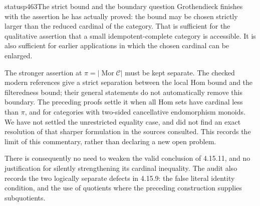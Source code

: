 \begin{dcomment}{status}{p463}{The strict bound and the boundary question}
Grothendieck finishes with the assertion he has actually proved: the bound may be chosen strictly larger than the reduced cardinal of the category. That is sufficient for the qualitative assertion that a small idempotent-complete category is accessible. It is also sufficient for earlier applications in which the chosen cardinal can be enlarged.

The stronger assertion at $\pi=|\operatorname{Mor}\mathcal C|$ must be kept separate. The checked modern references give a strict separation between the local Hom bound and the filteredness bound; their general statements do not automatically remove this boundary. The preceding proofs settle it when all Hom sets have cardinal less than $\pi$, and for categories with two-sided cancellative endomorphism monoids. We have not settled the unrestricted equality case, and did not find an exact resolution of that sharper formulation in the sources consulted. This records the limit of this commentary, rather than declaring a new open problem.

There is consequently no need to weaken the valid conclusion of 4.15.11, and no justification for silently strengthening its cardinal inequality. The audit also records the two logically separate defects in 4.15.9: the false literal identity condition, and the use of quotients where the preceding construction supplies subquotients.
\end{dcomment}


